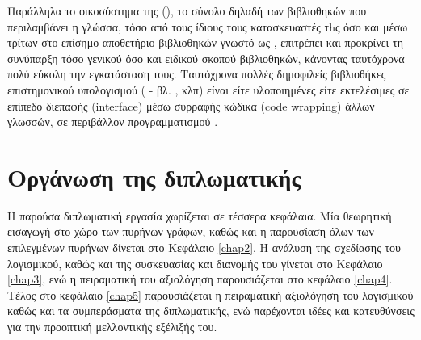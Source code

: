Παράλληλα το οικοσύστημα της  (), το σύνολο δηλαδή των βιβλιοθηκών που περιλαμβάνει η γλώσσα, τόσο από τους ίδιους τους κατασκευαστές τhς όσο και μέσω τρίτων στο επίσημο αποθετήριο βιβλιοθηκών γνωστό ως , επιτρέπει και προκρίνει τη συνύπαρξη τόσο γενικού όσο και ειδικού σκοπού βιβλιοθηκών, κάνοντας ταυτόχρονα πολύ εύκολη την εγκατάσταση τους.
Ταυτόχρονα πολλές δημοφιλείς βιβλιοθήκες επιστημονικού υπολογισμού ( - βλ. ,  κλπ) είναι είτε υλοποιημένες είτε εκτελέσιμες σε επίπεδο διεπαφής (interface) μέσω συρραφής κώδικα (code wrapping) άλλων γλωσσών, σε περιβάλλον προγραμματισμού .

\section{Οργάνωση της διπλωματικής}
Η παρούσα διπλωματική εργασία χωρίζεται σε τέσσερα κεφάλαια. Μία θεωρητική εισαγωγή στο χώρο των πυρήνων γράφων, καθώς και η παρουσίαση όλων των επιλεγμένων πυρήνων δίνεται στο Κεφάλαιο \ref{chap2}. Η ανάλυση της σχεδίασης του λογισμικού, καθώς και της συσκευασίας και διανομής του γίνεται στο Κεφάλαιο \ref{chap3}, ενώ η πειραματική του αξιολόγηση παρουσιάζεται στο κεφάλαιο \ref{chap4}. Τέλος στο κεφάλαιο \ref{chap5} παρουσιάζεται η πειραματική αξιολόγηση του λογισμικού καθώς και τα συμπεράσματα της διπλωματικής, ενώ παρέχονται ιδέες και κατευθύνσεις για την προοπτική μελλοντικής εξέλιξής του.
